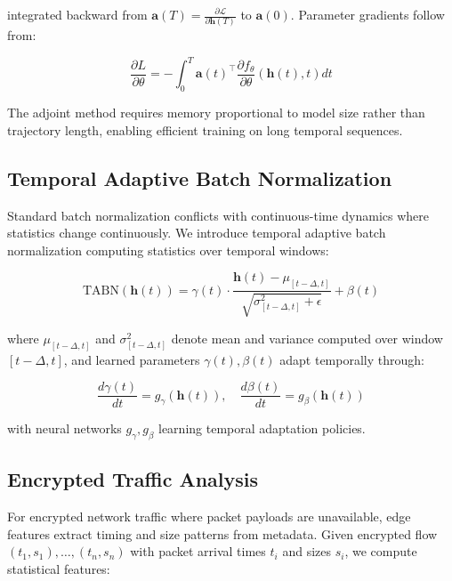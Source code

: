 integrated backward from $\mathbf{a}(T) = \frac{\partial \mathcal{L}}{\partial \mathbf{h}(T)}$ to $\mathbf{a}(0)$. Parameter gradients follow from:

\begin{equation}
\frac{\partial L}{\partial \theta} = -\int_0^T \mathbf{a}(t)^\top \frac{\partial f_\theta}{\partial \theta}(\mathbf{h}(t), t) dt
\end{equation}

The adjoint method requires memory proportional to model size rather than trajectory length, enabling efficient training on long temporal sequences.

\subsection{Temporal Adaptive Batch Normalization}

Standard batch normalization conflicts with continuous-time dynamics where statistics change continuously. We introduce temporal adaptive batch normalization computing statistics over temporal windows:

\begin{equation}
\text{TABN}(\mathbf{h}(t)) = \gamma(t) \cdot \frac{\mathbf{h}(t) - \mu_{[t-\Delta, t]}}{\sqrt{\sigma_{[t-\Delta, t]}^2 + \epsilon}} + \beta(t)
\end{equation}

where $\mu_{[t-\Delta, t]}$ and $\sigma_{[t-\Delta, t]}^2$ denote mean and variance computed over window $[t-\Delta, t]$, and learned parameters $\gamma(t), \beta(t)$ adapt temporally through:

\begin{equation}
\frac{d\gamma(t)}{dt} = g_\gamma(\mathbf{h}(t)), \quad \frac{d\beta(t)}{dt} = g_\beta(\mathbf{h}(t))
\end{equation}

with neural networks $g_\gamma, g_\beta$ learning temporal adaptation policies.

\subsection{Encrypted Traffic Analysis}

For encrypted network traffic where packet payloads are unavailable, edge features extract timing and size patterns from metadata. Given encrypted flow $(t_1, s_1), \ldots, (t_n, s_n)$ with packet arrival times $t_i$ and sizes $s_i$, we compute statistical features:


